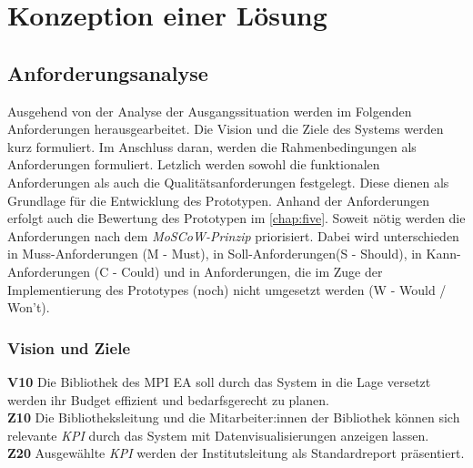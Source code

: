 \chapter{Konzeption einer Lösung}
\label{chap:four}

\section{Anforderungsanalyse}
Ausgehend von der Analyse der Ausgangssituation werden im Folgenden 
Anforderungen herausgearbeitet. Die Vision und die Ziele des Systems werden kurz formuliert. Im Anschluss daran,
werden die Rahmenbedingungen als Anforderungen formuliert. Letzlich werden sowohl die funktionalen Anforderungen als
auch die Qualitätsanforderungen festgelegt. Diese dienen als Grundlage für die Entwicklung des Prototypen. 
Anhand der Anforderungen erfolgt auch die Bewertung des Prototypen im \autoref{chap:five}. 
Soweit nötig werden die Anforderungen nach dem \textit{MoSCoW-Prinzip} priorisiert. 
Dabei wird unterschieden in Muss-Anforderungen (M - Must), in Soll-Anforderungen(S - Should), in Kann-Anforderungen (C - Could) und in Anforderungen,
die im Zuge der Implementierung des Prototypes (noch) nicht umgesetzt werden (W - Would / Won't).

\subsection{Vision und Ziele}
\textbf{V10} Die Bibliothek des \acrshort{MPI EA} soll durch das System in die Lage versetzt werden ihr Budget effizient und bedarfsgerecht zu planen.\\
\textbf{Z10} Die Bibliotheksleitung und die Mitarbeiter:innen der Bibliothek können sich relevante \textit{\acrshort{KPI}} durch das System mit
Datenvisualisierungen anzeigen lassen. \\
\textbf{Z20} Ausgewählte \textit{\acrshort{KPI}} werden der Institutsleitung als Standardreport präsentiert.

